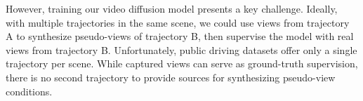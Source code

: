 




However, training our video diffusion model presents a key challenge. Ideally, with multiple trajectories in the same scene, we could use views from trajectory A to synthesize pseudo-views of trajectory B, then supervise the model with real views from trajectory B. Unfortunately, public driving datasets offer only a single trajectory per scene. While captured views can serve as ground-truth supervision, there is no second trajectory to provide sources for synthesizing pseudo-view conditions.

